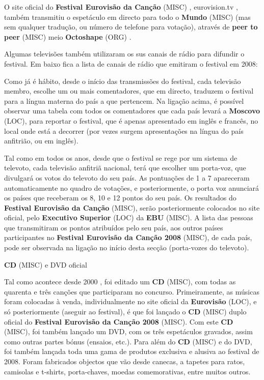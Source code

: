 \documentclass[12pt,a4paper]{article}
\begin{document}
O site oficial do \textbf{Festival Eurovisão da Canção} (MISC) , eurovision.tv , também transmitiu o espetáculo em directo para todo o \textbf{Mundo} (MISC) (mas sem qualquer tradução, ou número de telefone para votação), através de \textbf{peer to peer} (MISC) meio \textbf{Octoshape} (ORG) .

Algumas televisões também utilizaram os sus canais de rádio para difundir o festival. Em baixo fica a lista de canais de rádio que emitiram o festival em 2008:

Como já é hábito, desde o início das transmissões do festival, cada televisão membro, escolhe um ou mais comentadores, que em directo, traduzem o festival para a língua materna do país a que pertencem. Na ligação acima, é possível observar uma tabela com todos os comentadores que cada país levará a \textbf{Moscovo} (LOC), para reportar o festival, que é apenas apresentado em inglês e francês, no local onde está a decorrer (por vezes surgem apresentações na língua do país anfitrião, ou em inglês).

Tal como em todos os anos, desde que o festival se rege por um sistema de televoto, cada televisão anfitriã nacional, terá que escolher um porta-voz, que divulgará os votos do televoto do seu país. As pontuações de 1 a 7 apareceram automaticamente no quadro de votações, e posteriormente, o porta voz anunciará os países que receberam os 8, 10 e 12 pontos do seu país. Os resultados do \textbf{Festival Eurovisão da Canção} (MISC), serão posteriormente colocados no site oficial, pelo \textbf{Executivo Superior} (LOC) da \textbf{EBU} (MISC). A lista das pessoas que transmitiram os pontos atribuídos pelo seu país, aos outros países participantes no \textbf{Festival Eurovisão da Canção 2008} (MISC), de cada país, pode ser observada na ligação no início desta secção (porta-vozes do televoto).



\textbf{CD} (MISC) e DVD oficial

Tal como acontece desde 2000 , foi editado um \textbf{CD} (MISC), com todas as quarenta e três canções que participaram no concurso. Primeiramente, as músicas foram colocadas à venda, individualmente no site oficial da \textbf{Eurovisão} (LOC), e só posteriormente (aseguir ao festival), é que foi lançado o \textbf{CD} (MISC) duplo oficial do \textbf{Festival Eurovisão da Canção 2008} (MISC). Com este \textbf{CD} (MISC), foi também lançado um DVD, com os três espetáculos gravados, assim como outras partes bónus (ensaios, etc.). Para além do \textbf{CD} (MISC) e do DVD, foi também lançada toda uma gama de produtos exclusiva e alusiva ao festival de 2008. Foram fabricados objectos que vão desde canecas, a tapetes para ratos, camisolas e t-shirts, porta-chaves, moedas comemorativas, entre muitos outros.
\end{document}
